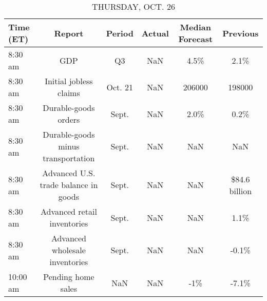 \documentclass{article}%
\begin{document}
%


\begin{table}[htbp]%
\caption{THURSDAY, OCT. 26}%
\centering%
\begin{adjustbox}{width=1\textwidth}%
\begin{tabular}{lccccc}
\toprule
Time (ET) &                               Report &  Period & Actual & Median Forecast &      Previous \\
\midrule
  8:30 am &                                  GDP &      Q3 &    NaN &            4.5\% &          2.1\% \\
  8:30 am &               Initial jobless claims & Oct. 21 &    NaN &          206000 &        198000 \\
  8:30 am &                 Durable-goods orders &   Sept. &    NaN &            2.0\% &          0.2\% \\
  8:30 am &   Durable-goods minus transportation &   Sept. &    NaN &             NaN &           NaN \\
  8:30 am & Advanced U.S. trade balance in goods &   Sept. &    NaN &             NaN & \$84.6 billion \\
  8:30 am &          Advanced retail inventories &   Sept. &    NaN &             NaN &          1.1\% \\
  8:30 am &       Advanced wholesale inventories &   Sept. &    NaN &             NaN &         -0.1\% \\
 10:00 am &                   Pending home sales &     NaN &    NaN &             -1\% &         -7.1\% \\
\bottomrule
\end{tabular}
%
\end{adjustbox}%
\end{table}

%
\end{document}
